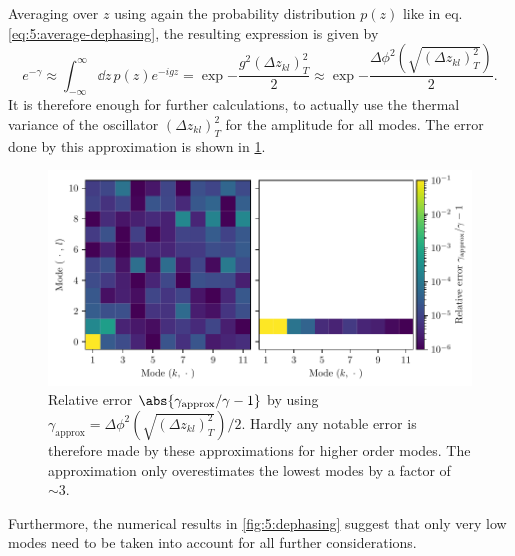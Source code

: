 Averaging over $z$ using again the probability distribution $p(z)$ like in eq. \eqref{eq:5:average-dephasing}, the resulting expression is given by
\begin{equation}
  e^{-\gamma} \approx \int_{-\infty}^{\infty} \dd z \, p(z) e^{-i g z} = \exp{-\frac{g^2 (\Delta z_{kl})^2_T}{2}} \approx \exp{-\frac{\Delta\phi^2\left(\sqrt{(\Delta z_{kl})^2_T}\right)}{2}} .
\end{equation}
It is therefore enough for further calculations, to actually use the thermal variance of the oscillator $(\Delta z_{kl})^2_T$ for the amplitude for all modes. The error done by this approximation is shown in \cref{fig:5:dephasing-approximation-error}.
\begin{figure}[!htbp]
  \centering
  \includegraphics[width=\textwidth]{./../figures/vibrations/vibrational-dephasing-approximation-error.pdf}
  \caption{Relative error $\abs{\gamma_\mathrm{approx} / \gamma - 1}$ by using $\gamma_\mathrm{approx} = \Delta\phi^2\left(\sqrt{(\Delta z_{kl})^2_T}\right)/2$. Hardly any notable error is therefore made by these approximations for higher order modes. The approximation only overestimates the lowest modes by a factor of $\sim 3$.}
  \label{fig:5:dephasing-approximation-error}
\end{figure}
Furthermore, the numerical results in \cref{fig:5:dephasing} suggest that only very low modes need to be taken into account for all further considerations.

